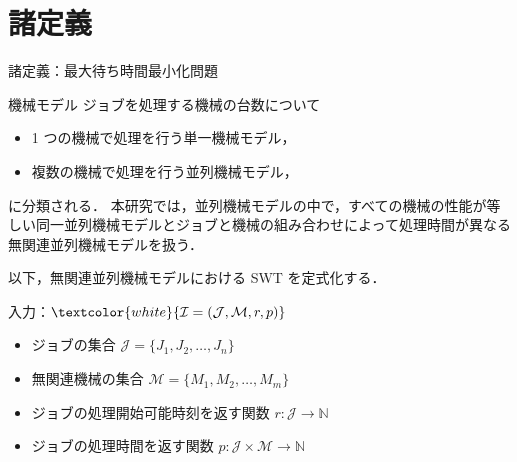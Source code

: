 \documentclass[dvipdfmx]{beamer}
\begin{document}
    \section{諸定義}
    \begin{frame}{諸定義：最大待ち時間最小化問題}
      \begin{block}{機械モデル}
        ジョブを処理する機械の台数について
        \begin{itemize}
          \item 1 つの機械で処理を行う\alert{単一機械モデル}，
          \item 複数の機械で処理を行う\alert{並列機械モデル}，
        \end{itemize}
        に分類される．
        本研究では，並列機械モデルの中で，すべての機械の性能が等しい\alert{同一並列機械モデル}とジョブと機械の組み合わせによって処理時間が異なる\alert{無関連並列機械モデル}を扱う．
      \end{block}

      以下，無関連並列機械モデルにおける SWT を定式化する．
      \begin{block}{入力：$\textcolor{white}{\mathcal{I} = (\mathcal{J}, \mathcal{M}, r, p)}$}
        \begin{itemize}
          \item {ジョブの集合 $\mathcal{J} = \{J_1,J_2,\ldots,J_n\}$}
          \item {無関連機械の集合 $\mathcal{M} = \{M_1,M_2,\ldots,M_m\}$}
          \item {ジョブの処理開始可能時刻を返す関数 $r : \mathcal{J} \to \mathbb{N}$}
          \item {ジョブの処理時間を返す関数 $p : \mathcal{J} \times \mathcal{M} \to \mathbb{N}$}
        \end{itemize}
      \end{block}
    \end{frame}
\end{document}

